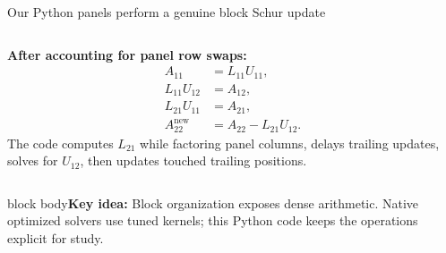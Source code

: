 \documentclass[aspectratio=169,10pt]{beamer}
\newcommand{\takeaway}[1]{\vfill\begin{beamercolorbox}[sep=7pt,wd=\textwidth]{block body}\small\textbf{Key idea:} #1\end{beamercolorbox}}
\begin{document}
\begin{frame}{Our Python panels perform a genuine block Schur update}
\begin{columns}[c,onlytextwidth]
\centering
{}
\textbf{After accounting for panel row swaps:}
\begin{align*}
 A_{11} &= L_{11}U_{11},\\
 L_{11}U_{12} &= A_{12},\\
 L_{21}U_{11} &= A_{21},\\
 A_{22}^{\mathrm{new}} &= A_{22}-L_{21}U_{12}.
\end{align*}
\small The code computes $L_{21}$ while factoring panel columns, delays trailing updates, solves for $U_{12}$, then updates touched trailing positions.
\end{columns}
\takeaway{Block organization exposes dense arithmetic. Native optimized solvers use tuned kernels; this Python code keeps the operations explicit for study.}
\end{frame}
\end{document}
